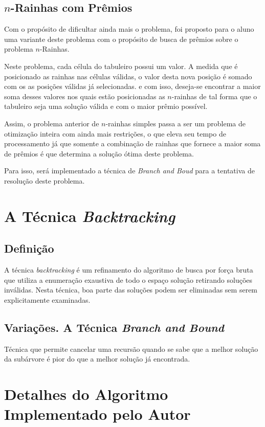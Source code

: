 \documentclass[12pt]{article}
\begin{document}
	\subsection{$n$-Rainhas com Prêmios}
		Com o propósito de dificultar ainda mais o problema, foi proposto para o aluno uma variante deste problema com o propósito de busca de prêmios sobre o problema $ n $-Rainhas.

		Neste problema, cada célula do tabuleiro possui um valor. A medida que é posicionado as rainhas nas células válidas, o valor desta nova posição é somado com os as posições válidas já selecionadas. e com isso, deseja-se encontrar a maior soma desses valores nos quais estão posicionadas as $ n $-rainhas de tal forma que o tabuleiro seja uma solução válida e com o maior prêmio possível.

		Assim, o problema anterior de $ n $-rainhas simples passa a ser um problema de otimização inteira com ainda mais restrições, o que eleva seu tempo de processamento já que somente a combinação de rainhas que fornece a maior soma de prêmios é que determina a solução ótima deste problema.

		Para isso, será implementado a técnica de \textit{Branch and Boud} para a tentativa de resolução deste problema.


\section{A Técnica \textit{Backtracking}}
	\subsection{Definição}
		A técnica \textit{backtracking} é um refinamento do algoritmo de busca por força bruta que utiliza a enumeração exaustiva de todo o espaço solução retirando soluções inválidas. Nesta técnica, boa parte das soluções podem ser eliminadas sem serem explicitamente examinadas.

	\subsection{Variações. A Técnica \textit{Branch and Bound}}
		Técnica que permite cancelar uma recursão quando se sabe que a melhor solução da subárvore é pior do que a melhor solução já encontrada.


\section{Detalhes do Algoritmo Implementado pelo Autor}
\end{document}
